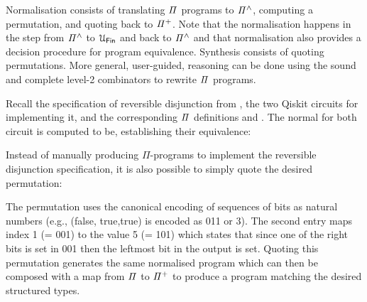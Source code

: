\noindent Normalisation consists of translating $\mathit{\Pi}$ programs to $\mathit{{\Pi}^{\wedge}}$, computing a permutation, and quoting
back to $\mathit{{\Pi}^{+}}$. Note that the normalisation happens in the step from $\mathit{{\Pi}^{\wedge}}$ to $\UFin$ and back to
$\mathit{{\Pi}^{\wedge}}$ and that normalisation also provides a decision procedure for program equivalence. Synthesis consists of
quoting permutations. More general, user-guided, reasoning can be done using the sound and complete level-2
combinators to rewrite $\mathit{\Pi}$ programs.

Recall the specification of reversible disjunction from , the two Qiskit circuits for implementing it, and the
corresponding $\mathit{\Pi}$ definitions  and . The normal for both circuit is
computed to be, establishing their equivalence:

\medskip
\resetnormtwo{}

Instead of manually producing $\Pi$-programs to implement the reversible disjunction specification, it is also possible
to simply quote the desired permutation:

\medskip
\resetperm{}

\noindent The permutation uses the canonical encoding of sequences of bits as natural numbers (e.g., (\textsf{false},
\textsf{true},\textsf{true}) is encoded as 011 or 3).  The second entry maps index 1 (= 001) to the value 5 (= 101)
which states that since one of the right bits is set in 001 then the leftmost bit in the output is set. Quoting this
permutation generates the same normalised program which can then be composed with a map from $\mathit{\Pi}$ to
$\mathit{{\Pi}^{+}}$ to produce a program matching the desired structured types.



